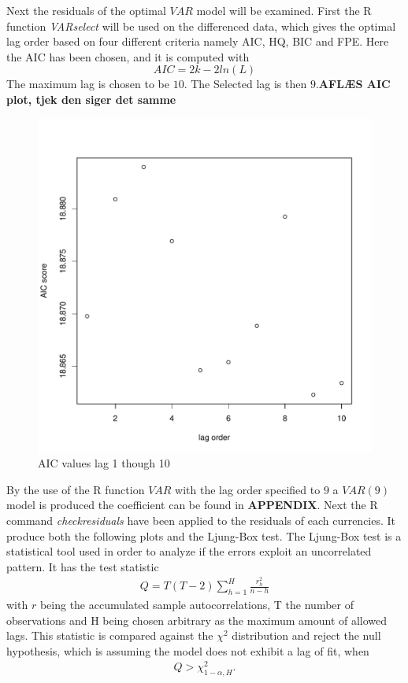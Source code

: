 \noindent Next the residuals of the optimal $VAR$ model will be examined. First the R function \textit{VARselect} will be used on the differenced data, which gives the optimal lag order based on four different criteria namely AIC, HQ, BIC and FPE. Here the AIC has been chosen, and it is computed with
\begin{equation*}
    AIC=2k-2ln(L)
\end{equation*}
The maximum lag is chosen to be $10$. The Selected lag is then $9$.\textbf{AFLÆS AIC plot, tjek den siger det samme}\\
\begin{figure}[H]
    \centering
    \includegraphics[width=0.5\linewidth]{1.Projekt_kode/Billeder/AIC_diffed_VAR.pdf}
    \caption{AIC values lag 1 though 10}
    \label{fig:enter-label}
\end{figure}
By the use of the R function $VAR$ with the lag order specified to $9$ a $VAR(9)$ model is produced the coefficient can be found in \textbf{APPENDIX}. Next the R command \textit{checkresiduals} have been applied to the residuals of each currencies. It produce both the following plots and the Ljung-Box test. The Ljung-Box test is a statistical tool used in order to analyze if the errors exploit an uncorrelated pattern. It has the test statistic 
\begin{align*}
    Q=T(T-2)\sum^H_{h=1}\frac{r^2_{h}}{n-h}
\end{align*}
with $r$ being the accumulated sample autocorrelations, T the number of observations and H being chosen arbitrary as the maximum amount of allowed lags. This statistic is compared against the $\chi^2$ distribution and reject the null hypothesis, which is assuming the model does not exhibit a lag of fit, when
\begin{align*}
    Q>\chi^2_{1-\alpha,H}.
\end{align*}

